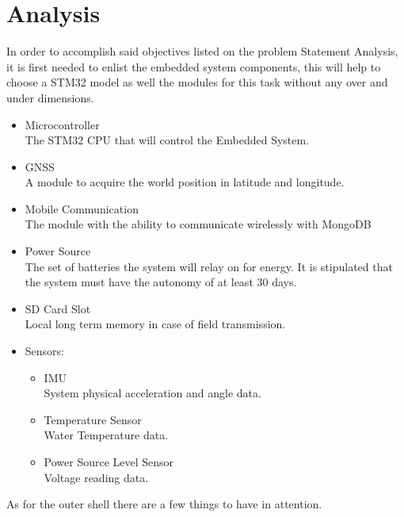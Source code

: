 \chapter{Analysis}
In order to accomplish said objectives listed on the problem Statement Analysis, it is first
needed to enlist the embedded system components, this will help to choose a STM32 model as 
well the modules for this task without any over and under dimensions.

\begin{itemize}
    \item Microcontroller \\\hspace*{1cm} The STM32 CPU that will control the Embedded System.
    \item GNSS \\\hspace*{1cm} A module to acquire the world position in latitude and longitude.
    \item Mobile Communication \\\hspace*{1cm} The module with the ability to communicate wirelessly with MongoDB 
    \item Power Source \\\hspace*{1cm} The set of batteries the system will relay on for energy. It is stipulated that
    the system must have the autonomy of at least 30 days.
    \item SD Card Slot \\ Local long term memory in case of field transmission.
    \item Sensors:
    \begin{itemize}
        \item IMU \\\hspace*{1cm} System physical acceleration and angle data.
        \item Temperature Sensor \\\hspace*{1cm} Water Temperature data.
        \item Power Source Level Sensor \\\hspace*{1cm} Voltage reading data.
    \end{itemize}
\end{itemize}

As for the outer shell there are a few things to have in attention. 

